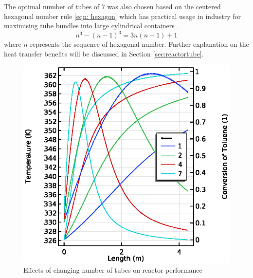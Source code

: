 The optimal number of tubes of 7 was also chosen based on the centered hexagonal number rule \cref{eqn: hexagon} which has practical usage in industry for maximising tube bundles into large cylindrical containers \cite{noauthor_realiable_2018}. 
\begin{equation}
    n^3 - (n-1)^3 = 3n(n-1)+1
    \label{eqn: hexagon}
\end{equation}
where $n$ represents the sequence of hexagonal number. Further explanation on the heat transfer benefits will be discussed in Section \ref{sec:reactortube}.

\begin{figure}[h]
    \begin{minipage}[t]{0.45\linewidth}
        \includegraphics[width=\linewidth]{figures/S5-T-X.eps}
        \caption{Effects of changing number of tubes on reactor performance}
        \label{fig:S5-T-X}
    \end{minipage}\hfill
    \begin{minipage}[t]{0.45\linewidth}

\end{minipage}
\end{figure}
